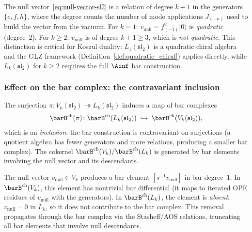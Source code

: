 \begin{remark}
\label{rem:null-vector-degree}
The null vector~\eqref{eq:null-vector-sl2} is a relation of
degree $k + 1$ in the generators $\{e, f, h\}$, where the
degree counts the number of mode applications $J_{(-n)}$ used
to build the vector from the vacuum. For $k = 1$:
$v_{\mathrm{null}} = f_{(-1)}^2 |0\rangle$ is
\emph{quadratic} (degree~$2$). For $k \ge 2$:
$v_{\mathrm{null}}$ is of degree $k + 1 \ge 3$, which is
\emph{not quadratic}. This distinction is critical for
Koszul duality: $L_1(\mathfrak{sl}_2)$ is a quadratic chiral
algebra and the GLZ framework
(Definition~\ref{def:quadratic_chiral}) applies directly,
while $L_k(\mathfrak{sl}_2)$ for $k \ge 2$ requires the full
$\Ainf$ bar construction.
\end{remark}


\subsubsection{Effect on the bar complex: the contravariant
 inclusion}
\label{subsubsec:bar-contravariant}

The surjection
$\pi \colon V_k(\mathfrak{sl}_2) \twoheadrightarrow
L_k(\mathfrak{sl}_2)$ induces a map of bar complexes
\begin{equation}\label{eq:bar-contravariant-inclusion}
 \barB^{\mathrm{ch}}(\pi)
 \colon
 \barB^{\mathrm{ch}}(L_k(\mathfrak{sl}_2))
 \;\hookrightarrow\;
 \barB^{\mathrm{ch}}(V_k(\mathfrak{sl}_2)),
\end{equation}
which is an \emph{inclusion}: the bar construction is
contravariant on surjections (a quotient algebra has fewer
generators and more relations, producing a smaller bar
complex). The cokernel
$\barB^{\mathrm{ch}}(V_k) / \barB^{\mathrm{ch}}(L_k)$ is
generated by bar elements involving the null vector and its
descendants.

The null vector $v_{\mathrm{null}} \in V_k$ produces a bar
element $[s^{-1} v_{\mathrm{null}}]$ in bar degree~$1$. In
$\barB^{\mathrm{ch}}(V_k)$, this element has nontrivial bar
differential (it maps to iterated OPE residues of
$v_{\mathrm{null}}$ with the generators). In
$\barB^{\mathrm{ch}}(L_k)$, the element is \emph{absent}:
$v_{\mathrm{null}} = 0$ in $L_k$, so it does not contribute
to the bar complex. This removal propagates through the bar
complex via the Stasheff/AOS relations, truncating all bar
elements that involve null descendants.

